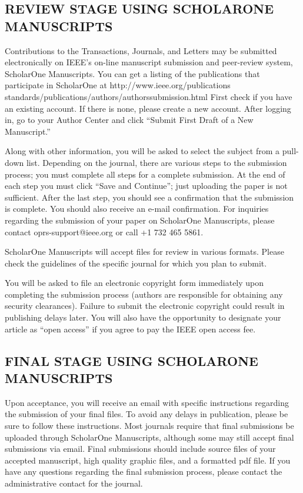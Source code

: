 \documentclass{IEEEoj-data}
\begin{document}
{\subsection*{REVIEW STAGE USING SCHOLARONE{\textregistered} MANUSCRIPTS}
Contributions to the Transactions, Journals, and Letters may be submitted 
electronically on IEEE's on-line manuscript submission and peer-review 
system, ScholarOne{\textregistered} Manuscripts. You can get a 
listing of the publications that participate in ScholarOne at 
http://www.ieee.org/\discretionary{}{}{}publications\textunderscore 
standards/publications/authors/authors\textunderscore\break submission.html First 
check if you have an existing account. If there is none, please create a new 
account. After logging in, go to your Author Center and click ``Submit First 
Draft of a New Manuscript.'' 

Along with other information, you will be asked to select the subject from a 
pull-down list. Depending on the journal, there are various steps to the 
submission process; you must complete all steps for a complete submission. 
At the end of each step you must click ``Save and Continue''; just uploading 
the paper is not sufficient. After the last step, you should see a 
confirmation that the submission is complete. You should also receive an 
e-mail confirmation. For inquiries regarding the submission of your paper on 
ScholarOne Manuscripts, please contact oprs-support@ieee.org or call +1 
732 465 5861.

ScholarOne Manuscripts will accept files for review in various formats. 
Please check the guidelines of the specific journal for which you plan to 
submit. 

You will be asked to file an electronic copyright form immediately upon 
completing the submission process (authors are responsible for obtaining any 
security clearances). Failure to submit the electronic copyright could 
result in publishing delays later. You will also have the opportunity to 
designate your article as ``open access'' if you agree to pay the IEEE open 
access fee. 

\subsection*{FINAL STAGE USING SCHOLARONE MANUSCRIPTS}
Upon acceptance, you will receive an email with specific instructions 
regarding the submission of your final files. To avoid any delays in 
publication, please be sure to follow these instructions. Most journals 
require that final submissions be uploaded through ScholarOne Manuscripts, 
although some may still accept final submissions via email. Final 
submissions should include source files of your accepted manuscript, high 
quality graphic files, and a formatted pdf file. If you have any questions 
regarding the final submission process, please contact the administrative 
contact for the journal. 

}
\end{document}
